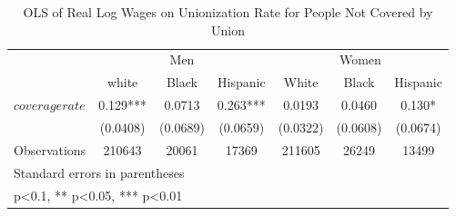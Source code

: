 \begin{table}[htbp]\centering
\def\sym#1{\ifmmode^{#1}\else\(^{#1}\)\fi}
\caption{OLS of Real Log Wages on Unionization Rate for People Not Covered by Union}
\begin{tabular}{l*{6}{c}}
\hline\hline
                    &\multicolumn{3}{c}{Men}                        &\multicolumn{3}{c}{Women}                      \\\cmidrule(lr){2-4}\cmidrule(lr){5-7}
                    &\multicolumn{1}{c}{white}&\multicolumn{1}{c}{Black}&\multicolumn{1}{c}{Hispanic}&\multicolumn{1}{c}{White}&\multicolumn{1}{c}{Black}&\multicolumn{1}{c}{Hispanic}\\
\hline
$ coveragerate $    &       0.129***&      0.0713   &       0.263***&      0.0193   &      0.0460   &       0.130*  \\
                    &    (0.0408)   &    (0.0689)   &    (0.0659)   &    (0.0322)   &    (0.0608)   &    (0.0674)   \\
\hline
Observations        &      210643   &       20061   &       17369   &      211605   &       26249   &       13499   \\
\hline\hline
\multicolumn{7}{l}{\footnotesize Standard errors in parentheses}\\
\multicolumn{7}{l}{\footnotesize * p<0.1, ** p<0.05, *** p<0.01}\\
\end{tabular}
\end{table}
